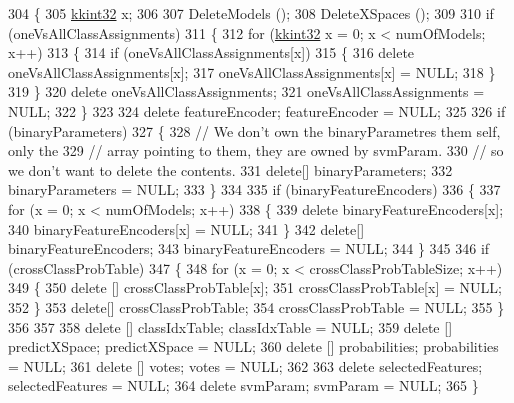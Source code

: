\begin{DoxyCode}
304 \{
305   \hyperlink{namespace_k_k_b_a8fa4952cc84fda1de4bec1fbdd8d5b1b}{kkint32}  x;
306 
307   DeleteModels ();
308   DeleteXSpaces ();
309 
310   \textcolor{keywordflow}{if}  (oneVsAllClassAssignments)
311   \{
312     \textcolor{keywordflow}{for}  (\hyperlink{namespace_k_k_b_a8fa4952cc84fda1de4bec1fbdd8d5b1b}{kkint32} x = 0;  x < numOfModels;  x++)
313     \{
314       \textcolor{keywordflow}{if}  (oneVsAllClassAssignments[x])
315       \{
316         \textcolor{keyword}{delete}  oneVsAllClassAssignments[x];
317         oneVsAllClassAssignments[x] = NULL;
318       \}
319     \}
320     \textcolor{keyword}{delete}  oneVsAllClassAssignments;
321     oneVsAllClassAssignments = NULL;
322   \}
323 
324   \textcolor{keyword}{delete}  featureEncoder;  featureEncoder = NULL;
325 
326   \textcolor{keywordflow}{if}  (binaryParameters)
327   \{
328     \textcolor{comment}{// We don't own the binaryParametres them self, only the }
329     \textcolor{comment}{// array pointing to them,  they are owned by svmParam.}
330     \textcolor{comment}{// so we don't want to delete the contents.}
331     \textcolor{keyword}{delete}[]  binaryParameters;
332     binaryParameters = NULL;
333   \}
334 
335   \textcolor{keywordflow}{if}  (binaryFeatureEncoders)
336   \{
337     \textcolor{keywordflow}{for}  (x = 0;  x < numOfModels;  x++)
338     \{
339       \textcolor{keyword}{delete}  binaryFeatureEncoders[x];
340       binaryFeatureEncoders[x] = NULL;
341     \}
342     \textcolor{keyword}{delete}[]  binaryFeatureEncoders;
343     binaryFeatureEncoders = NULL;
344   \}
345 
346   \textcolor{keywordflow}{if}  (crossClassProbTable)
347   \{
348     \textcolor{keywordflow}{for}  (x = 0;  x < crossClassProbTableSize;  x++)
349     \{
350       \textcolor{keyword}{delete}  [] crossClassProbTable[x];
351       crossClassProbTable[x] = NULL;
352     \}
353     \textcolor{keyword}{delete}[]  crossClassProbTable;
354     crossClassProbTable = NULL;
355   \}
356 
357 
358   \textcolor{keyword}{delete}  [] classIdxTable;   classIdxTable   = NULL;
359   \textcolor{keyword}{delete}  [] predictXSpace;   predictXSpace   = NULL;
360   \textcolor{keyword}{delete}  [] probabilities;   probabilities   = NULL;
361   \textcolor{keyword}{delete}  [] votes;           votes           = NULL;
362 
363   \textcolor{keyword}{delete}  selectedFeatures;  selectedFeatures = NULL;
364   \textcolor{keyword}{delete}  svmParam;          svmParam         = NULL;
365 \}
\end{DoxyCode}


